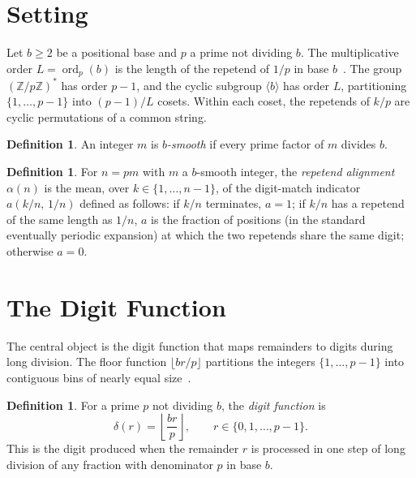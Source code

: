 \documentclass[12pt]{amsart}
\theoremstyle{definition}
\newtheorem{definition}[theorem]{Definition}
\theoremstyle{remark}
\begin{document}
\section{Setting}

Let $b \ge 2$ be a positional base and $p$ a prime not dividing $b$.
The multiplicative order $L = \operatorname{ord}_{p}(b)$ is the
length of the repetend of $1/p$ in base $b$~\cite{hardy}. The group
$(\mathbb{Z}/p\mathbb{Z})^{*}$ has order $p - 1$, and the cyclic
subgroup $\langle b \rangle$ has order $L$, partitioning
$\{1, \ldots, p{-}1\}$ into $(p{-}1)/L$ cosets. Within each coset,
the repetends of $k/p$ are cyclic permutations of a common string.

\begin{definition}
An integer $m$ is \emph{$b$-smooth} if every prime factor of $m$
divides $b$.
\end{definition}

\begin{definition}
For $n = pm$ with $m$ a $b$-smooth integer, the \emph{repetend
alignment} $\alpha(n)$ is the mean, over $k \in \{1, \ldots, n{-}1\}$,
of the digit-match indicator $a(k/n,\,1/n)$ defined as follows:
if $k/n$ terminates, $a = 1$; if $k/n$ has a repetend of the
same length as $1/n$, $a$ is the fraction of positions (in the
standard eventually periodic expansion) at which the two repetends
share the same digit; otherwise $a = 0$.
\end{definition}

\section{The Digit Function}

The central object is the digit function that maps remainders to
digits during long division. The floor function $\lfloor br/p \rfloor$
partitions the integers $\{1, \ldots, p{-}1\}$ into contiguous bins of
nearly equal size~\cite{fraenkel}.

\begin{definition}
For a prime $p$ not dividing $b$, the \emph{digit function} is
\[
\delta(r) = \left\lfloor \frac{br}{p} \right\rfloor,
\qquad r \in \{0, 1, \ldots, p{-}1\}.
\]
This is the digit produced when the remainder $r$ is processed in one
step of long division of any fraction with denominator $p$ in base $b$.
\end{definition}
\end{document}
